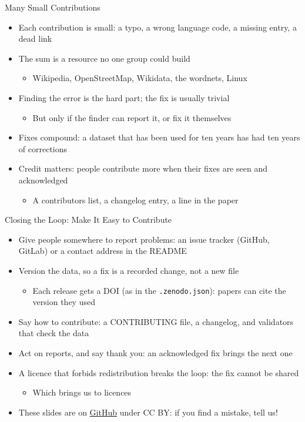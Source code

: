 \documentclass[aspectratio=169]{beamer}
\begin{document}
\begin{frame}{Many Small Contributions}
\begin{itemize}
  \item Each contribution is small: a typo, a wrong language code, a missing
    entry, a dead link
  \item The sum is a resource no one group could build
    \begin{itemize}
    \item Wikipedia, OpenStreetMap, Wikidata, the wordnets, Linux
    \end{itemize}
  \item Finding the error is the hard part; the fix is usually trivial
    \begin{itemize}
    \item But only if the finder can report it, or fix it themselves
    \end{itemize}
  \item Fixes compound: a dataset that has been used for ten years has
    had ten years of corrections
  \item Credit matters: people contribute more when their fixes are seen
    and acknowledged
    \begin{itemize}
    \item A contributors list, a changelog entry, a line in the paper
    \end{itemize}
\end{itemize}
\end{frame}

\begin{frame}{Closing the Loop: Make It Easy to Contribute}
\begin{itemize}
  \item Give people somewhere to report problems: an issue tracker
    (GitHub, GitLab) or a contact address in the README
  \item Version the data, so a fix is a recorded change, not a new file
    \begin{itemize}
    \item Each release gets a DOI (as in the \texttt{.zenodo.json}): papers
      can cite the version they used
    \end{itemize}
  \item Say how to contribute: a CONTRIBUTING file, a changelog, and
    validators that check the data
  \item Act on reports, and say thank you: an acknowledged fix brings the
    next one
  \item A licence that forbids redistribution breaks the loop: the fix
    cannot be shared
    \begin{itemize}
    \item Which brings us to licences
    \end{itemize}
  \item These slides are on
    \href{https://github.com/bond-lab/Open-Knowledge}{GitHub} under CC BY:
    if you find a mistake, tell us!
\end{itemize}
\end{frame}
\end{document}
